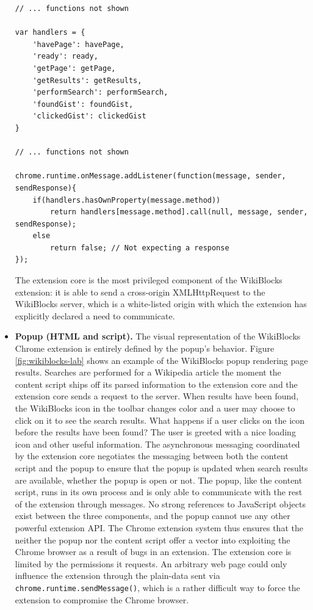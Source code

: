 \documentclass[a4paper, 11pt]{article} %
\begin{document}
\begin{itemize}
\eject

\begin{lstlisting}
// ... functions not shown

var handlers = {
	'havePage': havePage,
	'ready': ready,
	'getPage': getPage,
	'getResults': getResults,
	'performSearch': performSearch,
	'foundGist': foundGist,
	'clickedGist': clickedGist
}

// ... functions not shown

chrome.runtime.onMessage.addListener(function(message, sender, sendResponse){
	if(handlers.hasOwnProperty(message.method))
		return handlers[message.method].call(null, message, sender, sendResponse);
	else
		return false; // Not expecting a response
});
\end{lstlisting}

The extension core is the most privileged component of the WikiBlocks extension: it is able to send a cross-origin XMLHttpRequest to the WikiBlocks server, which is a white-listed origin with which the extension has explicitly declared a need to communicate.

\item \textbf{Popup (HTML and script).} The visual representation of the WikiBlocks Chrome extension is entirely defined by the popup's behavior. Figure \ref{fig:wikiblocks-lab} shows an example of the WikiBlocks popup rendering page results. Searches are performed for a Wikipedia article the moment the content script ships off its parsed information to the extension core and the extension core sends a request to the server. When results have been found, the WikiBlocks icon in the toolbar changes color and a user may choose to click on it to see the search results. What happens if a user clicks on the icon before the results have been found? The user is greeted with a nice loading icon and other useful information. The asynchronous messaging coordinated by the extension core negotiates the messaging between both the content script and the popup to ensure that the popup is updated when search results are available, whether the popup is open or not. The popup, like the content script, runs in its own process and is only able to communicate with the rest of the extension through messages. No strong references to JavaScript objects exist between the three components, and the popup cannot use any other powerful extension API. The Chrome extension system thus ensures that the neither the popup nor the content script offer a vector into exploiting the Chrome browser as a result of bugs in an extension. The extension core is limited by the permissions it requests. An arbitrary web page could only influence the extension through the plain-data sent via \texttt{chrome.runtime.sendMessage()}, which is a rather difficult way to force the extension to compromise the Chrome browser.
\end{itemize}
\end{document}
